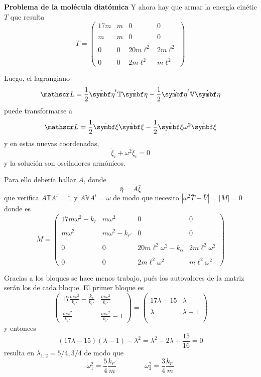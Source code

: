 \documentclass[10pt,oneside]{CBFT_book}
\begin{document}
\begin{ejemplo}{\bf Problema de la molécula diatómica}
Y ahora hay que armar la energía cinétic $T$ que resulta
\[
	T = \begin{pmatrix}
		17 m	 &	m 	&	0	&	0	\\
		\\
		m 	&	m 	&	0	&	0	\\
		\\
		0	&	0	&	20 m \ell^2  &	2 m \ell^2  \\
		\\
		0	&	0	&	2 m \ell^2  	&   m \ell^2
	    \end{pmatrix}
\]

Luego, el lagrangiano
\[
	\Lag = \frac{ 1 }{ 2 } \dot{\vb{\eta}}^t \mathbb{T} \dot{\vb{\eta}} -
	\frac{1}{2} \dot{\vb{\eta}}^t \mathbb{V} \dot{\vb{\eta}}
\]
puede transformarse a 
\[
	\Lag = \frac{ 1 }{ 2 } \dot{\vb{\xi}}\dot{\vb{\xi}} - \frac{1}{2} \dot{\vb{\xi}} \omega^2 \dot{\vb{\xi}}
\]
y en estas nuevas coordenadas,
\[
	\ddot{\xi}_i + \omega^2 \xi_i = 0
\]
y la solución son osciladores armónicos.

Para ello debería hallar $A$, donde 
\[
	\bar{\eta} = A \bar{\xi} 
\]
que verifica $A\mathbb{T}A^t = \mathbb{1}$ y $A\mathbb{V}A^t = \omega$ de modo que necesito $|\omega^2\bar{T} - 
\bar{V}|=|M|=0$ donde es
\[
	M = \begin{pmatrix}
		17 m \omega^2 - k_r	&	m \omega^2	&	0	&	0	\\
		\\
		m \omega^2	&	m \omega^2 - k_{r'}	&	0	&	0	\\
		\\
		0	&	0	&	20 m \ell^2 \omega^2 - k_\alpha	 &	2 m \ell^2 \omega^2 \\
		\\
		0	&	0	&	2 m \ell^2 \omega^2 	&   m \ell^2 \omega^2
	    \end{pmatrix}
\]

Gracias a los bloques se hace menos trabajo, pués los autovalores de la matriz serán los de cada bloque.
El primer bloque es
\[
	\begin{pmatrix}
	 \displaystyle 17 \frac{m\omega^2}{k_{r'}} -\frac{k_r}{k_{r'}} &  \displaystyle \frac{m\omega^2}{k_{r'}}  \\
	 \\
	 \displaystyle \frac{m\omega^2}{k_{r'}} &  \displaystyle \frac{m\omega^2}{k_{r'}} - 1
	 \end{pmatrix} =
	\begin{pmatrix}
	\\
	 \displaystyle 17 \lambda - 15 & \lambda  \\
	 \\
	  \displaystyle \lambda & \lambda - 1 \\
	  \\
	 \end{pmatrix}
\]
y entonces
\[
	(17\lambda -15)(\lambda -1) - \lambda^2 =  \lambda^2 - 2\lambda + \frac{15}{16} = 0
\]
resulta en $\lambda_{1,2} = 5/4, 3/4$ de modo que 
\[
	\omega^2_1 = \frac 5 4 \frac {k_{r'}}{m} \qquad \qquad 
	\omega^2_2 = \frac 3 4 \frac {k_{r'}}{m}
\]


\end{ejemplo}
\end{document}

